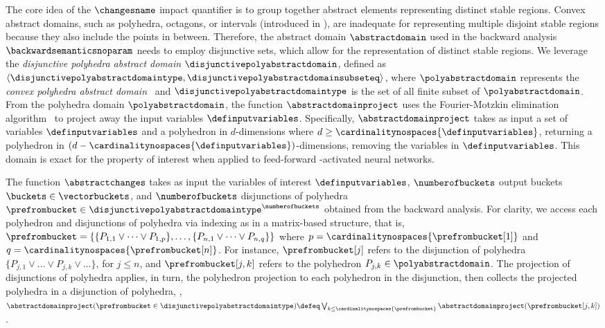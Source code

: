 The core idea of the $\changesname$ impact quantifier is to group together abstract elements representing distinct stable regions. Convex abstract domains, such as polyhedra, octagons, or intervals (introduced in ), are inadequate for representing multiple disjoint stable regions because they also include the points in between. Therefore, the abstract domain $\abstractdomain$ used in the backward analysis $\backwardsemanticsnoparam$ needs to employ disjunctive sets, which allow for the representation of distinct stable regions.
%
We leverage the \textit{disjunctive polyhedra abstract domain} $\disjunctivepolyabstractdomain$, defined as
$
  \langle \disjunctivepolyabstractdomaintype, \disjunctivepolyabstractdomainsubseteq \rangle
$, where $\polyabstractdomain$ represents the \textit{convex polyhedra abstract domain}~ and $\disjunctivepolyabstractdomaintype$ is the set of all finite subset of $\polyabstractdomain$.
From the polyhedra domain $\polyabstractdomain$, the function $\abstractdomainproject$ uses the Fourier-Motzkin elimination algorithm~ to project away the input variables $\definputvariables$.
Specifically, $\abstractdomainproject$ takes as input a set of variables $\definputvariables$ and a polyhedron in $d$-dimensions where $d \ge \cardinalitynospaces{\definputvariables}$, returning a polyhedron in $(d-\cardinalitynospaces{\definputvariables})$-dimensions, removing the variables in $\definputvariables$.
This domain is exact for the property of interest when applied to feed-forward \relu-activated neural networks.

The function $\abstractchanges$ takes as input the variables of interest $\definputvariables$, $\numberofbuckets$ output buckets $\buckets\in\vectorbuckets$, and $\numberofbuckets$ disjunctions of polyhedra $\prefrombucket\in\disjunctivepolyabstractdomaintype^\numberofbuckets$ obtained from the backward analysis.
For clarity, we access each polyhedron and disjunctions of polyhedra via indexing as in a matrix-based structure, that is, $\prefrombucket=\{\{P_{1,1}\vee \dots\vee P_{1,p}\},\dots,\{P_{n,1}\vee \dots\vee P_{n,q}\}\}$ where $p = \cardinalitynospaces{\prefrombucket[1]}$ and $q = \cardinalitynospaces{\prefrombucket[n]}$. For instance, $\prefrombucket[j]$ refers to the disjunction of polyhedra $\{P_{j,1}\vee \dots\vee P_{j,k}\vee \dots\}$, for $j\le n$, and $\prefrombucket[{j, k}]$ refers to the polyhedron $P_{j,k}\in\polyabstractdomain$.
The projection of disjunctions of polyhedra applies, in turn, the polyhedron projection to each polyhedron in the disjunction, then collects the projected polyhedra in a disjunction of polyhedra, \ie, $\abstractdomainproject(\prefrombucket \in \disjunctivepolyabstractdomaintype) \defeq \bigvee_{k \le \cardinalitynospaces{\prefrombucket}} \abstractdomainproject(\prefrombucket[j, k])$.

